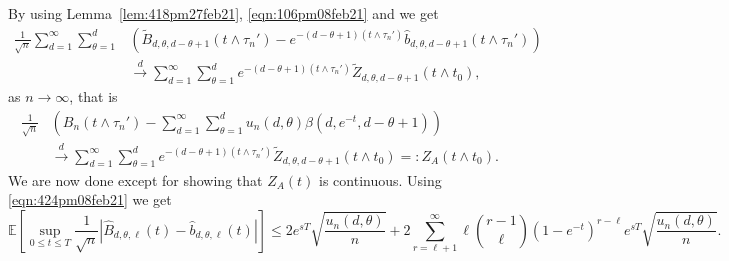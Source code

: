 \documentclass[11pt]{article}
\def\tod{\stackrel{d}{\longrightarrow}}
\def\tod{\stackrel{d}{\longrightarrow}}
\begin{document}
By using Lemma~\ref{lem:418pm27feb21}, \eqref{eqn:106pm08feb21} and \cite[Theorem 4.2]{billingsley2013convergence} we get
\begin{equation}\label{eqn:240pm16may22}
\begin{aligned}
        \frac{1}{\sqrt{n}} \sum_{d=1}^{\infty}\sum_{\theta=1}^{d}&\left(\widetilde{B}_{d,\theta,d-\theta+1}(t\wedge \tau_n') - e^{-(d-\theta+1) (t \wedge \tau_n')}\widehat{b}_{d,\theta,d-\theta+1}(t\wedge \tau_n' )\right) \\
        &\tod   \sum_{d=1}^{\infty}\sum_{\theta=1}^{d}e^{-(d-\theta+1) (t \wedge \tau_n')}\widetilde{Z}_{d,\theta,d-\theta+1}(t \wedge t_0),
\end{aligned}    
\end{equation}
as $n\to \infty$, that is 
\begin{equation}
\label{eqn:903pm16may22}
\begin{aligned}
    \frac{1}{\sqrt{n}}&\left(B_n(t\wedge \tau_n')- \sum_{d=1}^{\infty}\sum_{\theta=1}^{d} u_n(d,\theta) \beta(d,e^{-t},d-\theta+1)\right) \\
    &\tod 
    \sum_{d=1}^{\infty}\sum_{\theta=1}^{d}e^{-(d-\theta+1) (t \wedge \tau_n')}\widetilde{Z}_{d,\theta,d-\theta+1}(t \wedge t_0)=:Z_A(t\wedge t_0).
\end{aligned}    
\end{equation}
We are now done except for showing that $Z_A(t)$ is continuous. Using \eqref{eqn:424pm08feb21} we get
\begin{equation*}
  \mathbb{E}\left[\sup_{0\leq t\leq T} \frac{1}{\sqrt{n}} \left|\widehat{B}_{d,\theta,\ell}(t) - \widehat{b}_{d,\theta,\ell}(t)\right|\right] \leq 2e^{sT}\sqrt{\frac{u_n(d,\theta)}{n}}
    +2\sum_{r=\ell+1}^{\infty}\ell {r-1\choose \ell}(1-e^{-t})^{r-\ell} e^{sT}\sqrt{\frac{u_n(d,\theta)}{n}}. 
\end{equation*}
\end{document}
